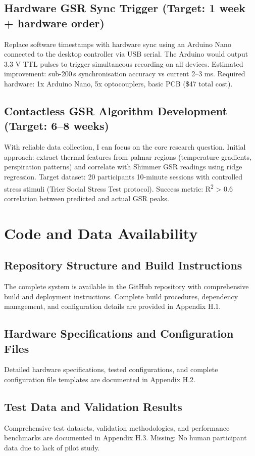 \subsection{Hardware GSR Sync Trigger (Target: 1 week + hardware order)}
Replace software timestamps with hardware sync using an Arduino Nano connected to the desktop controller via USB serial. The Arduino would output 3.3 V TTL pulses to trigger simultaneous recording on all devices. Estimated improvement: sub-200\,\textmu s synchronisation accuracy vs current 2--3 ms. Required hardware: 1x Arduino Nano, 5x optocouplers, basic PCB (\$47 total cost).

\subsection{Contactless GSR Algorithm Development (Target: 6--8 weeks)}
With reliable data collection, I can focus on the core research question. Initial approach: extract thermal features from palmar regions (temperature gradients, perspiration patterns) and correlate with Shimmer GSR readings using ridge regression. Target dataset: 20 participants \texttimes{} 10-minute sessions with controlled stress stimuli (Trier Social Stress Test protocol). Success metric: R\textsuperscript{2} \textgreater{} 0.6 correlation between predicted and actual GSR peaks.


\section{Code and Data Availability}

\subsection{Repository Structure and Build Instructions}
The complete system is available in the GitHub repository with comprehensive build and deployment instructions. Complete build procedures, dependency management, and configuration details are provided in Appendix H.1.

\subsection{Hardware Specifications and Configuration Files}
Detailed hardware specifications, tested configurations, and complete configuration file templates are documented in Appendix H.2.

\subsection{Test Data and Validation Results}
Comprehensive test datasets, validation methodologies, and performance benchmarks are documented in Appendix H.3. Missing: No human participant data due to lack of pilot study.

